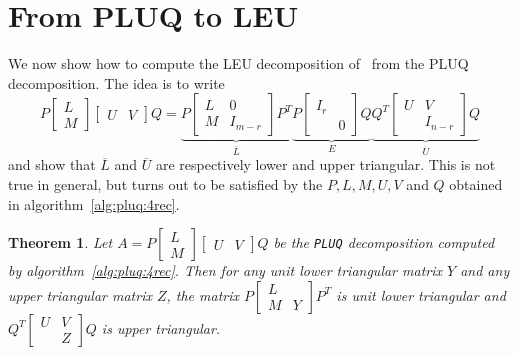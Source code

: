 \documentclass{article}
\newcommand{\pluq}{\texttt{PLUQ}\xspace}
\newtheorem{theorem}{Theorem}
\begin{document}
 \section{From PLUQ to LEU}\label{sec:leu}

\renewcommand{\arraystretch}{0.91}
\setlength{\arraycolsep}{.12\arraycolsep}

We now show how to compute the LEU decomposition of~\cite{Malaschonok:2010}
from the PLUQ decomposition. The idea is to write 
$$P
\begin{bmatrix} L\\M \end{bmatrix}
\begin{bmatrix}U&V\end{bmatrix}Q= 
\underbrace{
P
\begin{bmatrix}
  L&0\\
  M&I_{m-r}
\end{bmatrix}
P^T}_{\overline{L}} 
\underbrace{P
\begin{bmatrix}
  I_r\\&0
\end{bmatrix}
Q}_{E}
\underbrace{
 Q^T
\begin{bmatrix}
  U&V\\
  & I_{n-r}
\end{bmatrix}
Q}_{\overline{U}}$$
 and show that $\overline{L}$ and $\overline{U}$ are respectively lower and
 upper triangular. This is not true in general, but turns out to be
 satisfied by the $P,L,M,U,V$ and $Q$ obtained in
 algorithm~\ref{alg:pluq:4rec}.\setlength{\arraycolsep}{.13\arraycolsep}
\begin{theorem}
Let $A=P
\begin{bmatrix}
  L\\M
\end{bmatrix}
\begin{bmatrix}
  U&V
\end{bmatrix}
Q$ be the \pluq decomposition computed by algorithm~\ref{alg:pluq:4rec}.
Then for any unit lower triangular matrix $Y$ and any upper triangular matrix $Z$,
the matrix
$  P
  \begin{bmatrix}
    L \\
    M&Y
  \end{bmatrix}
P^T$ is  unit lower triangular and
$Q^T
\begin{bmatrix}
  U&V\\&Z
\end{bmatrix}Q$
is upper triangular.
\end{theorem}
\end{document}

